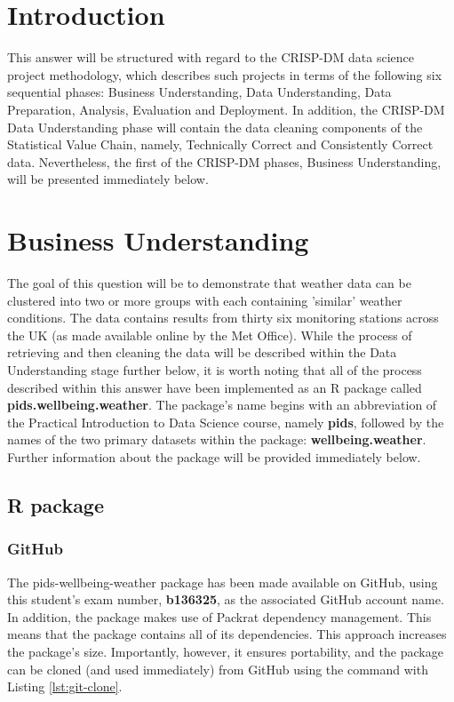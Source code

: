 \documentclass[12pt, oneside, openany]{book}
\begin{document}
\section*{Introduction}
This answer will be structured with regard to the CRISP-DM\cite{crispDm1.0} data science project methodology, which describes such projects in terms of the following six sequential phases: Business Understanding, Data Understanding, Data Preparation, Analysis, Evaluation and Deployment. In addition, the CRISP-DM Data Understanding phase will contain the data cleaning components of the Statistical Value Chain, namely, Technically Correct and Consistently Correct data. Nevertheless, the first of the CRISP-DM phases, Business Understanding, will be presented immediately below.

\section*{Business Understanding}
The goal of this question will be to demonstrate that weather data can be clustered into two or more groups with each containing 'similar' weather conditions. The data contains results from thirty six monitoring stations across the UK (as made available online by the Met Office). While the process of retrieving and then cleaning the data will be described within the Data Understanding stage further below, it is worth noting that all of the process described within this answer have been implemented as an R package called \textbf{pids.wellbeing.weather}. The package's name begins with an abbreviation of the Practical Introduction to Data Science course, namely \textbf{pids}, followed by the names of the two primary datasets within the package: \textbf{wellbeing.weather}. Further information about the package will be provided immediately below.

\subsection*{R package}

\subsubsection*{GitHub}
The pids-wellbeing-weather package has been made available on GitHub\cite{pids.wellbeing.weather}, using this student's exam number, \textbf{b136325}, as the associated GitHub account name. In addition, the package makes use of Packrat\cite{packrat} dependency management. This means that the package contains all of its dependencies. This approach increases the package's size. Importantly, however, it ensures portability, and the package can be cloned (and used immediately) from GitHub using the command with Listing \ref{lst:git-clone}.
\end{document}

